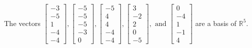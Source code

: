 \begin{exercise}
\begin{exerciseStatement}
  \end{exerciseStatement}
  \begin{exerciseAnswer}
   The vectors \(\left[\begin{array}{r}
-3 \\
-5 \\
1 \\
-4 \\
-4
\end{array}\right] , \left[\begin{array}{r}
-5 \\
-5 \\
-5 \\
-3 \\
0
\end{array}\right] , \left[\begin{array}{r}
-5 \\
4 \\
4 \\
-4 \\
-4
\end{array}\right] , \left[\begin{array}{r}
3 \\
-2 \\
2 \\
0 \\
-5
\end{array}\right] , \text{ and } \left[\begin{array}{r}
0 \\
-4 \\
1 \\
-1 \\
4
\end{array}\right]\) 
  	 are  a basis of \(\mathbb{R}^5\).
  


  \end{exerciseAnswer}
\end{exercise}